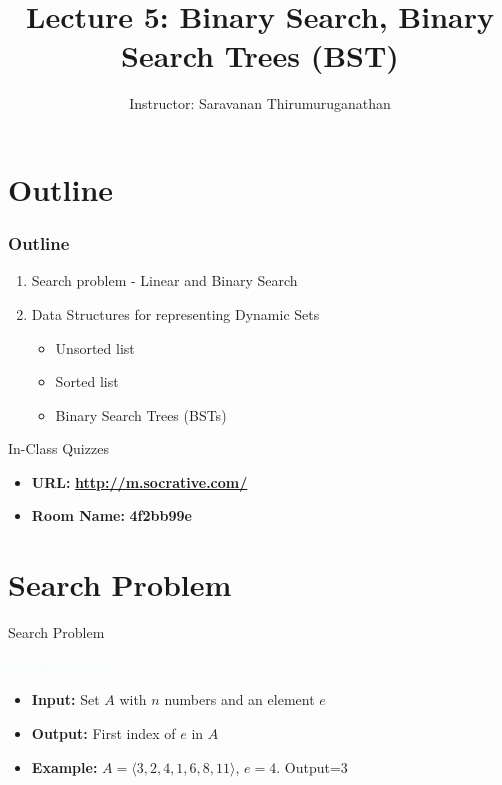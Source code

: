 \documentclass{beamer}
\title[Saravanan Thirumuruganathan] 
{Lecture 5: Binary Search, Binary Search Trees (BST)}
\author[CSE 5311] 
{Instructor: Saravanan Thirumuruganathan}
\date[]
\newcommand{\tblue}[1]{{\Large {\textcolor{azure}{#1}}}}
\begin{document}
\begin{frame}
  \titlepage
\end{frame}


\section{Outline}

\begin{frame}
\frametitle {Outline}
\begin{enumerate}
\item Search problem - Linear and Binary Search
\item Data Structures for representing Dynamic Sets
\begin{itemize}
    \item Unsorted list
    \item Sorted list
    \item Binary Search Trees (BSTs)
\end{itemize}
\end{enumerate}
\end{frame}

\begin{frame}{In-Class Quizzes}
\begin{itemize}
\item {\Large {\bf URL:}} {\LARGE \bf \url{http://m.socrative.com/}} 
\item {\Large {\bf Room Name:} {\LARGE \bf 4f2bb99e}}
\end{itemize}
\end{frame}

\section{Search Problem}


\begin{frame}{Search Problem}

\tblue{Search Problem}
\begin{itemize}
\item {\bf Input:} Set $A$ with $n$ numbers and an element $e$
\item {\bf Output:} First index of $e$ in $A$
\item {\bf Example:} $A = \langle 3, 2, 4, 1, 6, 8, 11 \rangle$, $e=4$. Output=$3$
\end{itemize}
\end{frame}
\end{document}
